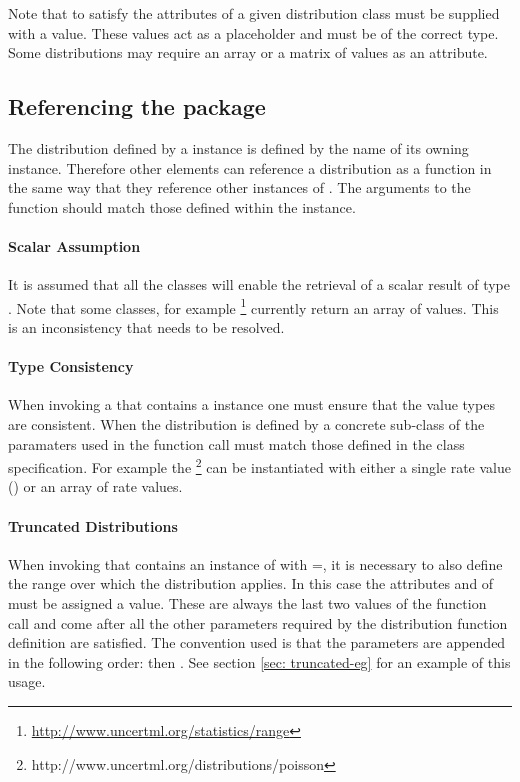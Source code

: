\documentclass[draftspec]{sbmlpkgspec}
\begin{document}
Note \contraversial that to satisfy \uncertml the attributes of a given
distribution class must be supplied with a value. These values act as
a placeholder and must be of the correct type. Some \uncertml
distributions may require an array or a matrix of values as an
attribute.

\subsection{Referencing the \distrib package}

The distribution defined by a \Distribution instance is defined by the
name of its owning \FunctionDefinition instance. Therefore other \SBML
elements can reference a distribution as a function in the same way that they
reference other instances of \FunctionDefinition. The arguments to the function
should match those defined within the \Distribution instance.

\paragraph{Scalar Assumption}

It is assumed \contraversial that all the \uncertml classes will enable
the retrieval of a scalar result of type . Note that
some \uncertml classes, for example
\footnote{\url{http://www.uncertml.org/statistics/range}}
currently return an array of values. This is an inconsistency that
needs to be resolved.

\paragraph{Type Consistency}

When invoking a \FunctionDefinition that contains a \Distribution
instance one must ensure that the value types are consistent. When the
distribution is defined by a concrete sub-class of \unidistrib the
paramaters used in the function call must match those defined in the
\uncertml class specification. For example the
\footnote{http://www.uncertml.org/distributions/poisson}
can be instantiated with either a single rate value
() or an array of rate values.

\paragraph{Truncated Distributions}

When invoking \FunctionDefinition that contains an instance of
\Distribution with =, it is necessary to
also define the range over which the distribution applies. In this
\contraversial case the attributes  and
 of \Distribution must be assigned a value. These
are always the last two values of the function call and come after all
the other parameters required by the distribution function definition
are satisfied. The convention used is that the parameters are appended
in the following order:  then .
See section \vref{sec: truncated-eg} for an example of this usage.
\end{document}
